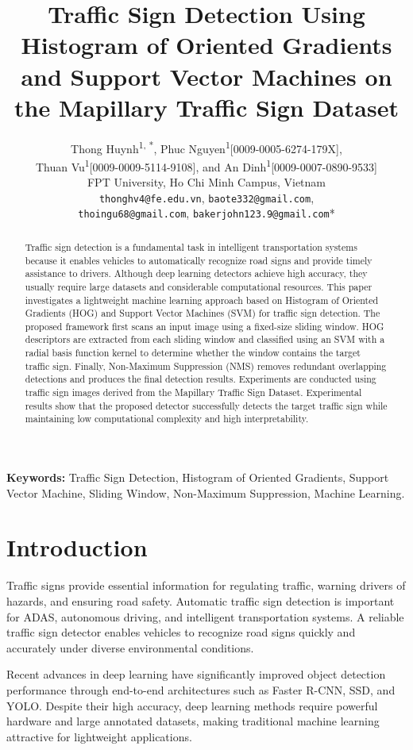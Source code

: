 \documentclass[11pt,a4paper,twoside]{article}
\title{\textbf{Traffic Sign Detection Using Histogram of Oriented Gradients and Support Vector Machines on the Mapillary Traffic Sign Dataset}}
\author{%
\begin{tabular}{c}
Thong Huynh\textsuperscript{1, *}, Phuc Nguyen\textsuperscript{1}[0009-0005-6274-179X],\\
Thuan Vu\textsuperscript{1}[0009-0009-5114-9108], and An Dinh\textsuperscript{1}[0009-0007-0890-9533]\\[0.45em]
FPT University, Ho Chi Minh Campus, Vietnam\\[0.25em]
\small\texttt{thonghv4@fe.edu.vn}, \texttt{baote332@gmail.com},\\
\small\texttt{thoingu68@gmail.com}, \texttt{bakerjohn123.9@gmail.com}*
\end{tabular}
}
\date{}
\begin{document}
\maketitle
\thispagestyle{empty}
\begin{abstract}

Traffic sign detection is a fundamental task in intelligent transportation systems because it enables vehicles to automatically recognize road signs and provide timely assistance to drivers. Although deep learning detectors achieve high accuracy, they usually require large datasets and considerable computational resources. This paper investigates a lightweight machine learning approach based on Histogram of Oriented Gradients (HOG) and Support Vector Machines (SVM) for traffic sign detection. The proposed framework first scans an input image using a fixed-size sliding window. HOG descriptors are extracted from each sliding window and classified using an SVM with a radial basis function kernel to determine whether the window contains the target traffic sign. Finally, Non-Maximum Suppression (NMS) removes redundant overlapping detections and produces the final detection results. Experiments are conducted using traffic sign images derived from the Mapillary Traffic Sign Dataset. Experimental results show that the proposed detector successfully detects the target traffic sign while maintaining low computational complexity and high interpretability.

\end{abstract}

\noindent\textbf{Keywords:} Traffic Sign Detection, Histogram of Oriented Gradients, Support Vector Machine, Sliding Window, Non-Maximum Suppression, Machine Learning.

\section{Introduction}

Traffic signs provide essential information for regulating traffic, warning drivers of hazards, and ensuring road safety. Automatic traffic sign detection is important for ADAS, autonomous driving, and intelligent transportation systems. A reliable traffic sign detector enables vehicles to recognize road signs quickly and accurately under diverse environmental conditions.

Recent advances in deep learning have significantly improved object detection performance through end-to-end architectures such as Faster R-CNN, SSD, and YOLO. Despite their high accuracy, deep learning methods require powerful hardware and large annotated datasets, making traditional machine learning attractive for lightweight applications.
\end{document}
